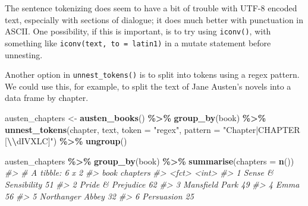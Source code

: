 \documentclass[
]{book}
\newenvironment{Shaded}{\begin{snugshade}}{\end{snugshade}}
\newcommand{\AttributeTok}[1]{\textcolor[rgb]{0.13,0.29,0.53}{#1}}
\newcommand{\CommentTok}[1]{\textcolor[rgb]{0.56,0.35,0.01}{\textit{#1}}}
\newcommand{\DecValTok}[1]{\textcolor[rgb]{0.00,0.00,0.81}{#1}}
\newcommand{\FunctionTok}[1]{\textcolor[rgb]{0.13,0.29,0.53}{\textbf{#1}}}
\newcommand{\NormalTok}[1]{#1}
\newcommand{\OtherTok}[1]{\textcolor[rgb]{0.56,0.35,0.01}{#1}}
\newcommand{\SpecialCharTok}[1]{\textcolor[rgb]{0.81,0.36,0.00}{\textbf{#1}}}
\newcommand{\StringTok}[1]{\textcolor[rgb]{0.31,0.60,0.02}{#1}}
\begin{document}
\begin{Shaded}
\end{Shaded}

The sentence tokenizing does seem to have a bit of trouble with UTF-8 encoded text, especially with sections of dialogue; it does much better with punctuation in ASCII. One possibility, if this is important, is to try using \texttt{iconv()}, with something like \texttt{iconv(text,\ to\ =\ \textquotesingle{}latin1\textquotesingle{})} in a mutate statement before unnesting.

Another option in \texttt{unnest\_tokens()} is to split into tokens using a regex pattern. We could use this, for example, to split the text of Jane Austen's novels into a data frame by chapter.

\begin{Shaded}
\begin{Highlighting}[]
\NormalTok{austen\_chapters }\OtherTok{\textless{}{-}} \FunctionTok{austen\_books}\NormalTok{() }\SpecialCharTok{\%\textgreater{}\%}
  \FunctionTok{group\_by}\NormalTok{(book) }\SpecialCharTok{\%\textgreater{}\%}
  \FunctionTok{unnest\_tokens}\NormalTok{(chapter, text, }\AttributeTok{token =} \StringTok{"regex"}\NormalTok{, }
                \AttributeTok{pattern =} \StringTok{"Chapter|CHAPTER [}\SpecialCharTok{\textbackslash{}\textbackslash{}}\StringTok{dIVXLC]"}\NormalTok{) }\SpecialCharTok{\%\textgreater{}\%}
  \FunctionTok{ungroup}\NormalTok{()}

\NormalTok{austen\_chapters }\SpecialCharTok{\%\textgreater{}\%} 
  \FunctionTok{group\_by}\NormalTok{(book) }\SpecialCharTok{\%\textgreater{}\%} 
  \FunctionTok{summarise}\NormalTok{(}\AttributeTok{chapters =} \FunctionTok{n}\NormalTok{())}
\CommentTok{\#\textgreater{} \# A tibble: 6 x 2}
\CommentTok{\#\textgreater{}   book                chapters}
\CommentTok{\#\textgreater{}   \textless{}fct\textgreater{}                  \textless{}int\textgreater{}}
\CommentTok{\#\textgreater{} 1 Sense \& Sensibility       51}
\CommentTok{\#\textgreater{} 2 Pride \& Prejudice         62}
\CommentTok{\#\textgreater{} 3 Mansfield Park            49}
\CommentTok{\#\textgreater{} 4 Emma                      56}
\CommentTok{\#\textgreater{} 5 Northanger Abbey          32}
\CommentTok{\#\textgreater{} 6 Persuasion                25}
\end{Highlighting}
\end{Shaded}
\end{document}
